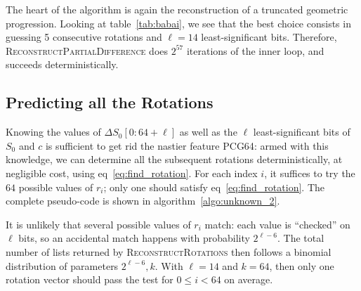 \documentclass[submission,svgnames,journal=tosc]{iacrtrans}
\begin{document}
The heart of the algorithm is again the reconstruction of a truncated geometric
progression. Looking at table~\ref{tab:babai}, we see that the best choice
consists in guessing 5 consecutive rotations and $\ell=14$ least-significant
bits. Therefore, \textsc{ReconstructPartialDifference} does $2^{57}$ iterations
of the inner loop, and succeeds deterministically.

\subsection{Predicting all the Rotations}

Knowing the values of $\Delta S_0[0:64+\ell]$ as well as the $\ell$
least-significant bits of $S_0$ and $c$ is sufficient to get rid the nastier
feature \textsf{PCG64}: armed with this knowledge, we can determine all the
subsequent rotations deterministically, at negligible cost, using
eq~\eqref{eq:find_rotation}. For each index $i$, it suffices to try the $64$
possible values of $r_i$; only one should satisfy
eq~\eqref{eq:find_rotation}. The complete pseudo-code is shown in
algorithm~\ref{algo:unknown_2}.

It is unlikely that several possible values of $r_i$ match: each value is
``checked'' on $\ell$ bits, so an accidental match happens with probability
$2^{\ell-6}$. The total number of lists returned by
\textsc{ReconstructRotations} then follows a binomial distribution of parameters
$2^{\ell-6}, k$. With $\ell=14$ and $k=64$, then only one rotation vector should
pass the test for $0 \leq i < 64$ on average.
\end{document}
